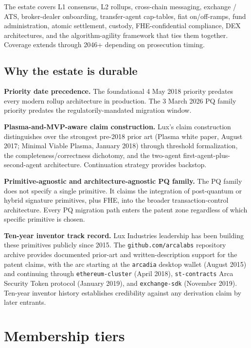 \documentclass[11pt,letterpaper]{article}
\begin{document}
The estate covers L1 consensus, L2 rollups, cross-chain messaging, exchange / ATS, broker-dealer onboarding, transfer-agent cap-tables, fiat on/off-ramps, fund administration, atomic settlement, custody, FHE-confidential compliance, DEX architectures, and the algorithm-agility framework that ties them together. Coverage extends through 2046+ depending on prosecution timing.

\subsection{Why the estate is durable}

\textbf{Priority date precedence.} The foundational 4 May 2018 priority predates every modern rollup architecture in production. The 3 March 2026 PQ family priority predates the regulatorily-mandated migration window.

\textbf{Plasma-and-MVP-aware claim construction.} Lux's claim construction distinguishes over the strongest pre-2018 prior art (Plasma white paper, August 2017; Minimal Viable Plasma, January 2018) through threshold formalization, the completeness/correctness dichotomy, and the two-agent first-agent-plus-second-agent architecture. Continuation strategy provides backstop.

\textbf{Primitive-agnostic and architecture-agnostic PQ family.} The PQ family does not specify a single primitive. It claims the integration of post-quantum or hybrid signature primitives, plus FHE, into the broader transaction-control architecture. Every PQ migration path enters the patent zone regardless of which specific primitive is chosen.

\textbf{Ten-year inventor track record.} Lux Industries leadership has been building these primitives publicly since 2015. The \texttt{github.com/arcalabs} repository archive provides documented prior-art and written-description support for the patent claims, with the arc starting at the \texttt{arcadia} desktop wallet (August 2015) and continuing through \texttt{ethereum-cluster} (April 2018), \texttt{st-contracts} Arca Security Token protocol (January 2019), and \texttt{exchange-sdk} (November 2019). Ten-year inventor history establishes credibility against any derivation claim by later entrants.

\section{Membership tiers}
\end{document}
